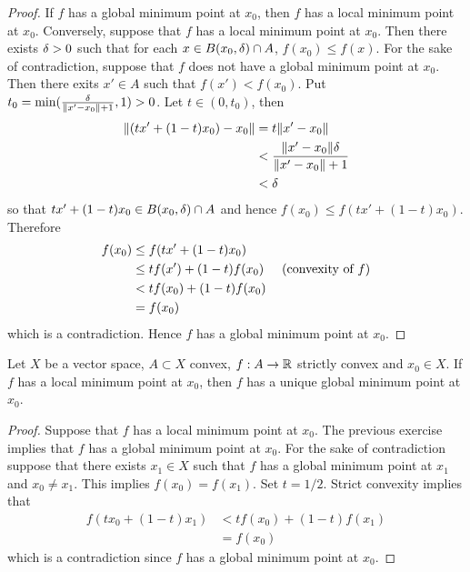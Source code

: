 \documentclass{book}
\begin{document}
	\begin{proof}
	If $f$ has a global minimum point at $x_0$, then $f$ has a local minimum point at $x_0$. Conversely, suppose that $f$ has a local minimum point at $x_0$. Then there exists $\delta >0$ such that for each $x \in B(x_0, \delta) \cap A$, $f(x_0) \leq f(x)$. For the sake of contradiction, suppose that $f$ does not have a global minimum point at $x_0$. Then there exits $x' \in A$ such that $f(x') < f(x_0)$. Put $t_0 = \min(\frac{\delta}{\|x' - x_0\| + 1}, 1) >0$. Let $t \in (0, t_0)$, then
	\begin{align*}
	\|(tx' + (1-t)x_0) - x_0\| 
	&= t\|x' -x_0 \| \\
	& <   \frac{\|x' -x_0 \|\delta}{\|x' -x_0\| + 1} \\
	& < \delta
	\end{align*} 
	so that $tx' + (1-t)x_0 \in B(x_0, \delta) \cap A$ and hence $f(x_0) \leq f(tx' + (1-t)x_0)$.  Therefore  
	\begin{align*}
	f(x_0) 
	& \leq f(tx' + (1-t)x_0) \\
	& \leq tf(x') + (1-t)f(x_0)  \hspace{.5cm} (\text{convexity of }f)\\
	& < tf(x_0) + (1-t)f(x_0) \\
	&= f(x_0)
	\end{align*}
	which is a contradiction. Hence $f$ has a global minimum point at $x_0$.
	\end{proof}
	
	\begin{ex} 
	Let $X$ be a vector space, $A \subset X$ convex, $f:A \rightarrow \mathbb{R}$ strictly convex and $x_0 \in X$. If $f$ has a local minimum point at $x_0$, then $f$ has a unique global minimum point at $x_0$.  
	\end{ex}
	
	\begin{proof}
	Suppose that $f$ has a local minimum point at $x_0$. The previous exercise implies that $f$ has a global minimum point at $x_0$. For the sake of contradiction suppose that there exists $x_1 \in X$ such that $f$ has a global minimum point at $x_1$ and $x_0 \neq x_1$. This implies $f(x_0) = f(x_1)$. Set $t = 1/2$. Strict convexity implies that 
	\begin{align*}
	f(tx_0 + (1-t)x_1) 
	&< tf(x_0) + (1-t)f(x_1)  \\
	&= f(x_0) 
	\end{align*}
	which is a contradiction since $f$ has a global minimum point at $x_0$.
	\end{proof}
\end{document}
